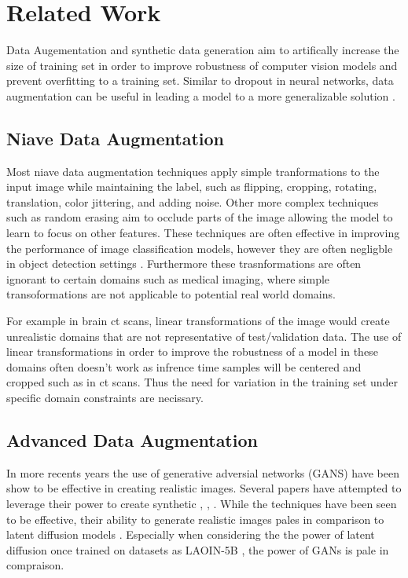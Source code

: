 \documentclass{article}
\begin{document}
\section{Related Work}

Data Augementation and synthetic data generation aim to artifically increase the size of training set in order to improve robustness
of computer vision models and prevent overfitting to a training set. Similar to dropout in neural networks, data augmentation can be
useful in leading a model to a more generalizable solution \cite{1708.04896}.

\subsection{Niave Data Augmentation}

Most niave data augmentation techniques apply simple tranformations to the input image while maintaining the label, such as flipping,
cropping, rotating, translation, color jittering, and adding noise. Other more complex techniques such as random erasing aim to occlude
parts of the image allowing the model to learn to focus on other features. These techniques are often effective in improving the performance
of image classification models, however they are often negligble in object detection settings \cite{2204.08610}. Furthermore these trasnformations are often ignorant 
to certain domains such as medical imaging, where simple transoformations are not applicable to potential real world domains.

For example in brain ct scans, linear transformations of the image would create unrealistic domains that are not representative of test/validation data. 
The use of linear transformations in order to improve the robustness of a model in these domains often doesn't work as infrence time samples will be centered 
and cropped such as in ct scans. Thus the need for variation in the training set under specific domain constraints are necissary. 

\subsection{Advanced Data Augmentation}

In more recents years the use of generative adversial networks (GANS) \cite{1406.2661} have been show to be effective in creating realistic images. Several papers
have attempted to leverage their power to create synthetic \cite{1911.02888}, \cite{2104.06490}, \cite{2106.05258}. While the techniques have been seen to be effective,
their ability to generate realistic images pales in comparison to latent diffusion models \cite{2112.10752}. Especially when considering the the power of latent diffusion
once trained on datasets as LAOIN-5B \cite{2210.08402}, the power of GANs is pale in compraison.
\end{document}
